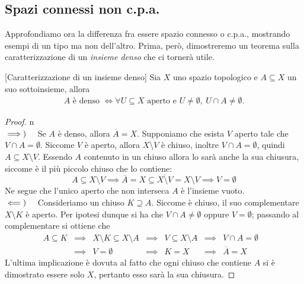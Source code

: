 \subsection{Spazi connessi non c.p.a.}
Approfondiamo ora la differenza fra essere spazio connesso o c.p.a., mostrando esempi di un tipo ma non dell'altro. Prima, però, dimostreremo un teorema sulla caratterizzazione di un \textit{insieme denso} che ci tornerà utile.
\begin{theorem}{}[Caratterizzazione di un insieme denso]
	Sia $X$ uno spazio topologico e $A\subseteq X$ un suo sottoinsieme, allora
		\begin{gather*}
			A \text{ è denso }\iff \forall U\subseteq X \text{ aperto e }U\neq\emptyset, \ U\cap A\neq\emptyset.
		\end{gather*}
\end{theorem}
\begin{proof}{n}~{}\\
	$\implies)\quad$ Se $A$ è denso, allora $\overline{A}=X$. Supponiamo che esista $ V$ aperto tale che $ V\cap A=\emptyset$. Siccome $V$ è aperto, allora $X\setminus V$ è chiuso, inoltre $V\cap A=\emptyset$, quindi $A\subseteq X\setminus V$. Essendo $A$ contenuto in un chiuso allora lo sarà anche la sua chiusura, siccome è il più piccolo chiuso che lo contiene:
		\begin{equation*}
			A\subseteq X\setminus V \implies \overline{A}=X\subseteq \overline{X\setminus V}=X\setminus V \implies V=\emptyset
		\end{equation*}
	Ne segue che l'unico aperto che non interseca $A$ è l'insieme vuoto. \\
	$\impliedby)\quad$ Consideriamo un chiuso $K\supseteq A$. Siccome è chiuso, il suo complementare $X\setminus K$ è aperto. Per ipotesi dunque si ha che $V\cap A\neq \emptyset$ oppure $V=\emptyset$; passando al complementare si ottiene che
		\begin{equation*}
			\begin{array}{llllllll}
				A\subseteq K &\implies& X\setminus K \subseteq X\setminus A &\implies& V\subseteq X\setminus A &\implies& V\cap A=\emptyset&\\
				& \implies& V=\emptyset& \implies& K=X& \implies & \overline{A}=X&
			\end{array}
		\end{equation*}
	L'ultima implicazione è dovuta al fatto che ogni chiuso che contiene $A$ si è dimostrato essere solo $X$, pertanto esso sarà la sua chiusura.\qedhere
\end{proof}


